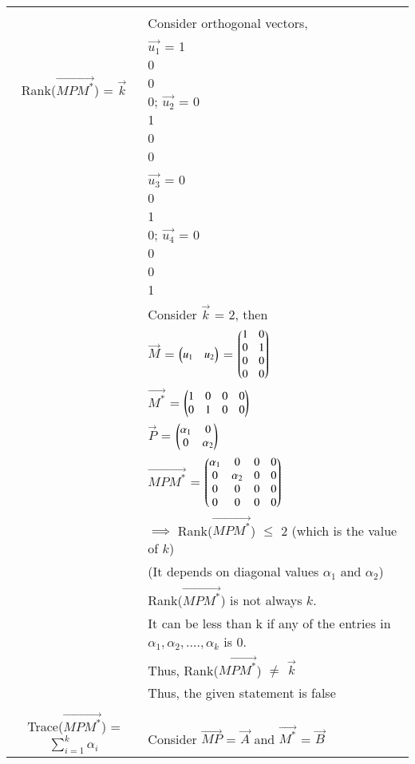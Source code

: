 \begin{longtable}{|c|l|}
    \hline
	\multirow{3}{*}{Rank($\vec{MP{M}^*}$) = $\vec{k}$} 
	& \\
	& Consider orthogonal vectors,\\
	& $\vec{u_1}$ = \myvec{1\\0\\0\\0}; $\vec{u_2}$ = \myvec{0\\1\\0\\0}\\
	& $\vec{u_3}$ = \myvec{0\\0\\1\\0}; $\vec{u_4}$ = \myvec{0\\0\\0\\1}\\
	& Consider $\vec{k}$ = 2, then \\
	& $\vec{M}$ = $\begin{pmatrix}u_1&u_2\end{pmatrix}$ = $\begin{pmatrix}1&0\\0&1\\0&0\\0&0\end{pmatrix}$\\
	& $\vec{M^*}$ = $\begin{pmatrix}1&0&0&0\\0&1&0&0\end{pmatrix}$\\
	& $\vec{P}$ = $\begin{pmatrix}\alpha_1&0\\0&\alpha_2\end{pmatrix}$\\
	& $\vec{MPM^{*}}$ = $\begin{pmatrix}\alpha_1&0&0&0\\
	                       0&\alpha_2&0&0\\
	                       0&0&0&0\\
	                       0&0&0&0\end{pmatrix}$\\
	& $\implies$ Rank($\vec{MPM^{*}}$) $\le$ 2 (which is the value of $k$)\\
	& (It depends on diagonal values $\alpha_1$ and $\alpha_2$)\\
	& Rank($\vec{MPM^{*}}$) is not always $k$. \\
	& It can be less than k if any of the entries in $\alpha_1,\alpha_2,....,\alpha_k$ is 0.\\
	& Thus, Rank($\vec{MP{M}^*}$) $\ne$ $\vec{k}$\\
	& Thus, the given statement is false\\
	&\\
	\hline
	\multirow{3}{*}{Trace($\vec{MP{M}^*}$) = $\sum_{i=1}^{k}\alpha_i$} & \\
	& Consider $\vec{MP}$ = $\vec{A}$ and $\vec{M^{*}}$ = $\vec{B}$\\

\end{longtable}

